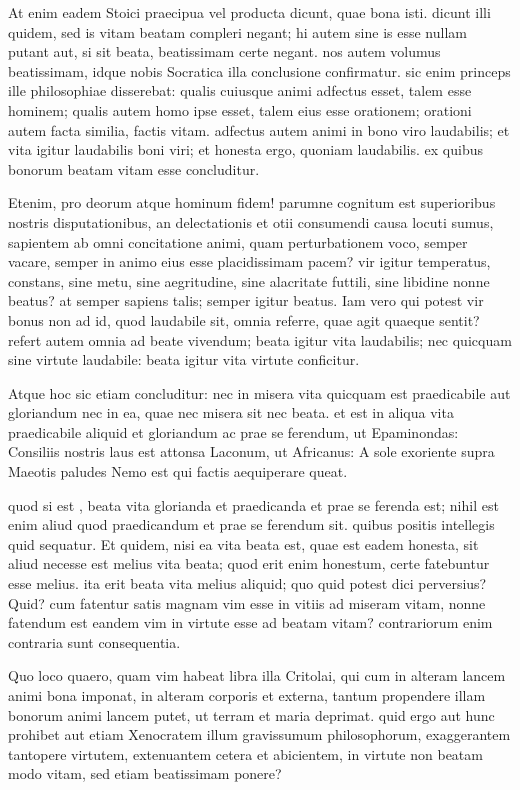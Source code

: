  At enim eadem Stoici praecipua vel producta dicunt, quae bona isti. dicunt illi quidem, sed is vitam beatam compleri negant; hi autem sine is esse nullam putant aut, si sit beata, beatissimam certe negant. nos autem volumus beatissimam, idque nobis Socratica illa conclusione confirmatur. sic enim princeps ille philosophiae disserebat: qualis cuiusque animi adfectus esset, talem esse hominem; qualis autem homo ipse esset, talem eius esse orationem; orationi autem facta similia, factis vitam. adfectus autem animi in bono viro laudabilis; et vita igitur laudabilis boni viri; et honesta ergo, quoniam laudabilis. ex quibus bonorum beatam vitam esse concluditur.

 Etenim, pro deorum atque hominum fidem! parumne cognitum est superioribus nostris disputationibus, an delectationis et otii consumendi causa locuti sumus, sapientem ab omni concitatione animi, quam perturbationem voco, semper vacare, semper in animo eius esse placidissimam pacem? vir igitur temperatus, constans, sine metu, sine aegritudine, sine alacritate futtili, sine libidine nonne beatus? at semper sapiens talis; semper igitur beatus. Iam vero qui potest vir bonus non ad id, quod laudabile sit, omnia referre, quae agit quaeque sentit? refert autem omnia ad beate vivendum; beata igitur vita laudabilis; nec quicquam sine virtute laudabile: beata igitur vita virtute conficitur.

 Atque hoc sic etiam concluditur: nec in misera vita quicquam est praedicabile aut gloriandum nec in ea, quae nec misera sit nec beata. et est in aliqua vita praedicabile aliquid et gloriandum ac prae se ferendum, ut Epaminondas: Consiliis nostris laus est attonsa Laconum, ut Africanus: A sole exoriente supra Maeotis paludes Nemo est qui factis aequiperare queat.

 quod si est , beata vita glorianda et praedicanda et prae se ferenda est; nihil est enim aliud quod praedicandum et prae se ferendum sit. quibus positis intellegis quid sequatur. Et quidem, nisi ea vita beata est, quae est eadem honesta, sit aliud necesse est melius vita beata; quod erit enim honestum, certe fatebuntur esse melius. ita erit beata vita melius aliquid; quo quid potest dici perversius? Quid? cum fatentur satis magnam vim esse in vitiis ad miseram vitam, nonne fatendum est eandem vim in virtute esse ad beatam vitam? contrariorum enim contraria sunt consequentia.

 Quo loco quaero, quam vim habeat libra illa Critolai, qui cum in alteram lancem animi bona imponat, in alteram corporis et externa, tantum propendere illam bonorum animi lancem putet, ut terram et maria deprimat. quid ergo aut hunc prohibet aut etiam Xenocratem illum gravissumum philosophorum, exaggerantem tantopere virtutem, extenuantem cetera et abicientem, in virtute non beatam modo vitam, sed etiam beatissimam ponere?

